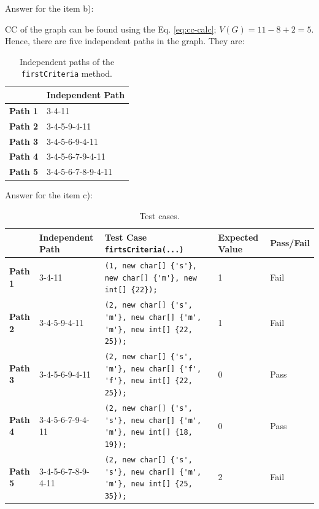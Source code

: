 \begin{exercise}
    Answer for the item b):
    
    CC of the graph can be found using the Eq. \ref{eq:cc-calc}; $V(G) = 11 - 8 + 2 = 5$. Hence, there are five independent paths in the graph. They are:
    \begin{table}[H]
        \centering
        \renewcommand{\arraystretch}{1.2}
        \caption{Independent paths of the \lstinline!firstCriteria! method.}
        \label{tab:ex8-indep-paths}
        \begin{tabularx}{\textwidth}{lX}
            \toprule
             & Independent Path\\
             \midrule
            \textbf{Path 1} & 3-4-11\\
            \textbf{Path 2} & 3-4-5-9-4-11\\
            \textbf{Path 3} & 3-4-5-6-9-4-11\\
            \textbf{Path 4} & 3-4-5-6-7-9-4-11\\
            \textbf{Path 5} & 3-4-5-6-7-8-9-4-11\\
            \bottomrule
        \end{tabularx}
    \end{table}
    
    Answer for the item c):
    
    \begin{table}[H]
        \centering
        \renewcommand{\arraystretch}{1.2}
        \caption{Test cases.}
        \label{tab:e8-test-cases}
        \begin{adjustbox}{max width=\textwidth}
            \begin{tabular}{lllll}
                \toprule
                 & Independent Path & Test Case \lstinline!firtsCriteria(...)! & Expected Value & Pass/Fail\\
                \midrule
                \textbf{Path 1} & 3-4-11 & \lstinline!(1, new char[] {'s'}, new char[] {'m'}, new int[] {22});! & 1 & Fail\\
                \textbf{Path 2} & 3-4-5-9-4-11 & \lstinline!(2, new char[] {'s', 'm'}, new char[] {'m', 'm'}, new int[] {22, 25});! & 1 & Fail\\
                \textbf{Path 3} & 3-4-5-6-9-4-11 & \lstinline!(2, new char[] {'s', 'm'}, new char[] {'f', 'f'}, new int[] {22, 25});! & 0 & Pass\\
                \textbf{Path 4} & 3-4-5-6-7-9-4-11 & \lstinline!(2, new char[] {'s', 's'}, new char[] {'m', 'm'}, new int[] {18, 19});! & 0 & Pass\\
                \textbf{Path 5} & 3-4-5-6-7-8-9-4-11 & \lstinline!(2, new char[] {'s', 's'}, new char[] {'m', 'm'}, new int[] {25, 35});! & 2 & Fail\\
                \bottomrule
            \end{tabular}
        \end{adjustbox}
    \end{table}
    

\end{exercise}
